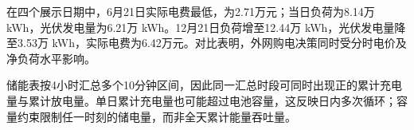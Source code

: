 在四个展示日期中，6月21日实际电费最低，为2.71万元；当日负荷为8.14万 kWh，光伏发电量为6.21万 kWh。12月21日负荷增至12.44万 kWh，光伏发电量降至3.53万 kWh，实际电费为6.42万元。对比表明，外网购电决策同时受分时电价及净负荷水平影响。

储能表按4小时汇总多个10分钟区间，因此同一汇总时段可同时出现正的累计充电量与累计放电量。单日累计充电量也可能超过电池容量，这反映日内多次循环；容量约束限制任一时刻的储电量，而非全天累计能量吞吐量。
